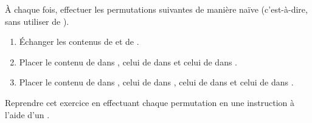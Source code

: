 
À chaque fois, effectuer les permutations suivantes de manière naïve (c'est-à-dire, sans utiliser de ).
\begin{enumerate}[label=\emph{\alph*)}]
  \item \'Echanger les contenus de  et de .
  \item Placer le contenu de  dans , celui de  dans  et celui de  dans .
  \item Placer le contenu de  dans , celui de  dans , celui de  dans  et celui de  dans .
\end{enumerate}
Reprendre cet exercice en effectuant chaque permutation en une instruction à l'aide d'un .